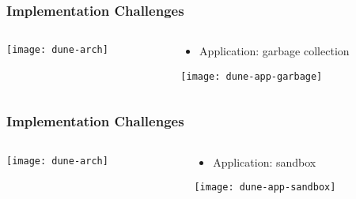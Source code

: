\begin{frame}[plain]
	\frametitle{ Implementation	 Challenges}
	
	
	
	\begin{columns}
		
		\begin{column}{.4\textwidth}
			
			
			\texttt{[image: dune-arch]}
			
		\end{column}
		
		\begin{column}{.6\textwidth}
			\begin{itemize}
				\item Application: garbage	collection
			\end{itemize}
			
			\texttt{[image: dune-app-garbage]}
		\end{column}
		
		
	\end{columns}
	
	
\end{frame}



\begin{frame}[plain]
	\frametitle{ Implementation	 Challenges}
	
	
	
	\begin{columns}
		
		\begin{column}{.4\textwidth}
			
			
			\texttt{[image: dune-arch]}
			
		\end{column}
		
		\begin{column}{.6\textwidth}
			\begin{itemize}
				\item Application: sandbox
			\end{itemize}
			
			\texttt{[image: dune-app-sandbox]}
		\end{column}
		
		
	\end{columns}
	
	
\end{frame}

